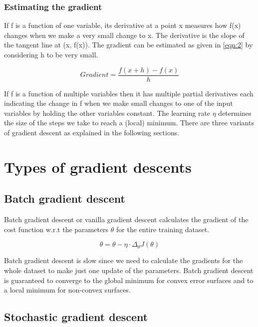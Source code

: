 \documentclass[a4paper, 12pt, oneside, BCOR1cm,toc=chapterentrywithdots]{scrbook}
\begin{document}
\subsubsection{Estimating the gradient}


If f is a function of one variable, its derivative at a point x measures how f(x) changes when we make a very small change to x. The derivative is the slope of the tangent line at (x, f(x)). The gradient can be estimated as given in \ref{eqn:2} by considering h to be very small.

\begin{equation} \label{eqn:2}
Gradient = \frac{f(x+h) - f(x)}{h}
\end{equation}

If f is a function of multiple variables then it has multiple partial derivatives each indicating the change in f when we make small changes to one of the input variables by holding the other variables constant. The learning rate $\eta$ determines the size of the steps we take to reach a (local) minimum. There are three variants of gradient descent as explained in the following sections.

\section{Types of gradient descents }

\subsection{Batch gradient descent}

Batch gradient descent or vanilla gradient descent calculates the gradient of the cost function w.r.t the parameters $\theta$ for the entire training dataset. 

\begin{equation} \label{eqn:3}
\theta = \theta - \eta \cdot \Delta_{\theta} J(\theta)
\end{equation}

Batch gradient descent is slow since we need to calculate the gradients for the whole dataset to make just one update of the parameters. Batch gradient descent is guaranteed to converge to the global minimum for convex error surfaces and to a local minimum for non-convex surfaces.

\subsection{Stochastic gradient descent}
\end{document}
